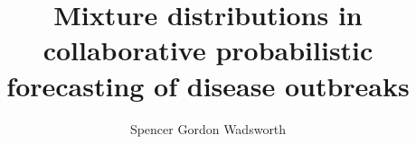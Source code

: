 
\@makechapterheada\titlepage  %
\title{Mixture distributions in collaborative probabilistic 
forecasting of disease outbreaks}

\author{Spencer Gordon Wadsworth}









